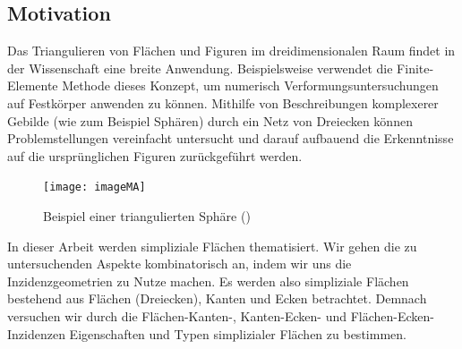 \documentclass[12pt,titlepage,twoside,cleardoublepage]{article}
\theoremstyle{nummermitklammern}
\numberwithin{equation}{section}
\begin{document}
\subsection{Motivation}
Das Triangulieren von Flächen und Figuren im dreidimensionalen Raum findet in der Wissenschaft eine breite Anwendung. Beispielsweise verwendet die Finite-Elemente Methode dieses Konzept, um numerisch Verformungsuntersuchungen auf Festkörper anwenden zu können. Mithilfe von Beschreibungen komplexerer Gebilde (wie zum Beispiel Sphären) durch ein Netz von Dreiecken können Problemstellungen vereinfacht untersucht und darauf aufbauend die Erkenntnisse auf die ursprünglichen Figuren zurückgeführt werden. 
\begin{figure}[H]
\begin{center}
\texttt{[image: imageMA]}
\end{center}
\caption{Beispiel einer triangulierten Sphäre (\cite{pic})}
\end{figure}
In dieser Arbeit werden simpliziale Flächen thematisiert. Wir gehen die zu untersuchenden Aspekte kombinatorisch an, indem wir uns die Inzidenzgeometrien zu Nutze machen. Es werden also simpliziale Flächen bestehend aus Flächen (Dreiecken), Kanten und Ecken betrachtet. Demnach versuchen wir durch die Flächen-Kanten-, Kanten-Ecken- und Flächen-Ecken-Inzidenzen Eigenschaften und Typen simplizialer Flächen zu bestimmen. 
\end{document}
